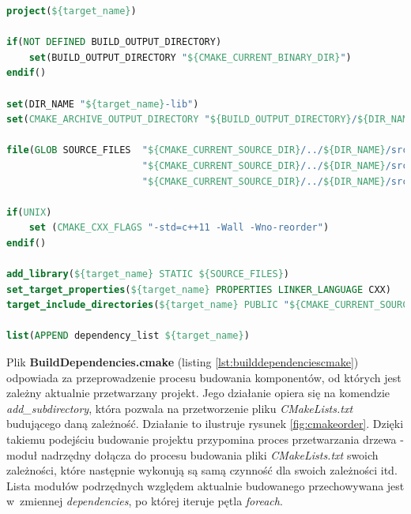 \begin{lstlisting}[language=cmake, caption={Plik \textit{BuildLibrary.cmake} będący częścią systemu budującego projekt GGSS. Poszczególne linie odpowiadają m.in. za dodanie nowego projektu, określenie katalogu, w~którym odbędzie się budowanie i~katalogu docelowego, zebranie plików biblioteki oraz dodanie jej do projektu. }, label={lst:buildlibrarycmake}]
project(${target_name})

if(NOT DEFINED BUILD_OUTPUT_DIRECTORY)
    set(BUILD_OUTPUT_DIRECTORY "${CMAKE_CURRENT_BINARY_DIR}")
endif()

set(DIR_NAME "${target_name}-lib")
set(CMAKE_ARCHIVE_OUTPUT_DIRECTORY "${BUILD_OUTPUT_DIRECTORY}/${DIR_NAME}/lib") 

file(GLOB SOURCE_FILES  "${CMAKE_CURRENT_SOURCE_DIR}/../${DIR_NAME}/src/*.cpp"
                        "${CMAKE_CURRENT_SOURCE_DIR}/../${DIR_NAME}/src/*.cxx"
                        "${CMAKE_CURRENT_SOURCE_DIR}/../${DIR_NAME}/src/*.c")

if(UNIX)
    set (CMAKE_CXX_FLAGS "-std=c++11 -Wall -Wno-reorder")
endif()

add_library(${target_name} STATIC ${SOURCE_FILES})
set_target_properties(${target_name} PROPERTIES LINKER_LANGUAGE CXX)
target_include_directories(${target_name} PUBLIC "${CMAKE_CURRENT_SOURCE_DIR}/include")

list(APPEND dependency_list ${target_name})
\end{lstlisting}


Plik \textbf{BuildDependencies.cmake} (listing \ref{lst:builddependenciescmake}) odpowiada za przeprowadzenie procesu budowania komponentów, od których jest zależny aktualnie przetwarzany projekt. Jego działanie opiera się na komendzie \textit{add\_subdirectory}, która pozwala na przetworzenie pliku \textit{CMakeLists.txt} budującego daną zależność. Działanie to ilustruje rysunek \ref{fig:cmakeorder}. Dzięki takiemu podejściu budowanie projektu przypomina proces przetwarzania drzewa - moduł nadrzędny dołącza do procesu budowania pliki \textit{CMakeLists.txt} swoich zależności, które następnie wykonują są samą czynność dla swoich zależności itd. Lista modułów podrzędnych względem aktualnie budowanego przechowywana jest w~zmiennej \textit{dependencies}, po której iteruje pętla \textit{foreach}.



